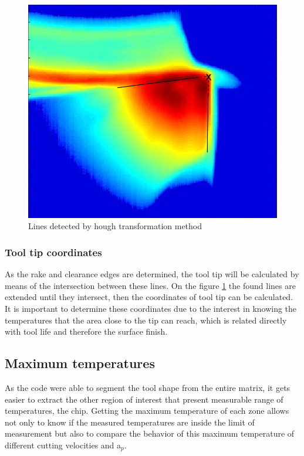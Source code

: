 		\begin{figure}[H]
		\centering
		\captionsetup{justification=centering}
		\includegraphics[scale = 0.6]{Imagens/hough.png}
		\caption{Lines detected by hough transformation method}
		\label{fig:hough}
		\end{figure}

		\subsubsection{Tool tip coordinates}

		As the rake and clearance edges are determined, the tool tip will be calculated by means of the intersection between these lines. On the figure \ref{fig:hough} the found lines are extended until they intersect, then the coordinates of tool tip can be calculated. It is important to determine these coordinates due to the interest in knowing the temperatures that the area close to the tip can reach, which is related directly with tool life and therefore the surface finish.

	\subsection{Maximum temperatures}

	As the code were able to segment the tool shape from the entire matrix, it gets easier to extract the other region of interest that present measurable range of temperatures, the chip. Getting the maximum temperature of each zone allows not only to know if the measured temperatures are inside the limit of measurement but also to compare the behavior of this maximum temperature of different cutting velocities and a$_{p}$.

